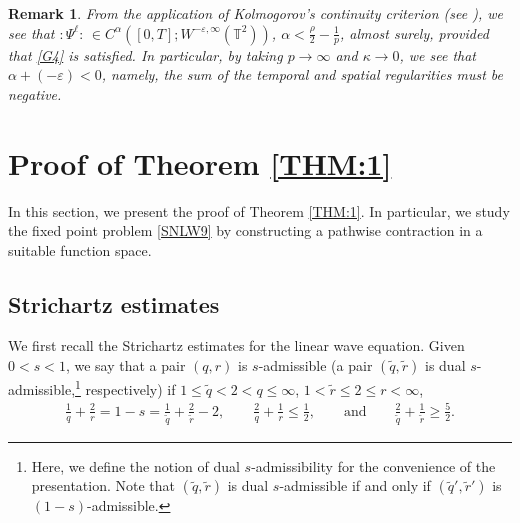 \documentclass[letterpaper, 11pt,  reqno]{amsart}
\newtheorem{remark}[theorem]{Remark}
\newcommand{\1}{\hspace{0.5mm}\text{I}\hspace{0.5mm}}
\newcommand{\T}{\mathbb{T}}
\newcommand{\al}{\alpha}
\newcommand{\dl}{\delta}
\newcommand{\eps}{\varepsilon}
\newcommand{\wt}{\widetilde}
\renewcommand{\l}{\ell}
\numberwithin{equation}{section}
\numberwithin{theorem}{section}
\newcommand{\notemax}[1]{\marginpar{\color{red} $\Leftarrow\Leftarrow\Leftarrow$}{\color{red}MAX: #1}}
\begin{document}
\begin{remark} \rm
From the application of Kolmogorov's continuity criterion (see \cite[Exercise 8.2]{Bass}), 
we see that 
$:\! \Psi^{\ell}\!\! : \, \in C^\al  ([0, T] ; W^{- \eps,\infty}(\T^2))$,
$\al < \frac{\rho}{2} - \frac 1p$,  almost surely,
provided that \eqref{G4} is satisfied.
In particular,  by taking $p \to \infty$ and $\kappa \to 0$, 
we see that $\al + (- \eps) < 0$,
namely, the sum of the temporal and spatial regularities must be negative.



\end{remark}

%
%




\section{Proof of Theorem \ref{THM:1}}
\label{SEC:3}


In this section, we present the proof of Theorem \ref{THM:1}.
In particular, we study the fixed point problem
\eqref{SNLW9}
by constructing a pathwise contraction
in a suitable function space.


\subsection{Strichartz estimates}
\label{SUBSEC:3.1}

We first recall the Strichartz estimates
for the  linear wave equation.
Given  $0 < s < 1$, 
we say that a pair $(q, r)$ is $s$-admissible 
(a pair $(\wt q, \wt r)$ is dual $s$-admissible,\footnote{Here, we define
the notion of dual $s$-admissibility for the convenience of the presentation.
Note that $(\wt q, \wt r)$ is dual $s$-admissible
if and only if $(\wt q', \wt r')$ is $(1-s)$-admissible.}
 respectively)
if $1 \leq \wt q < 2 < q \leq \infty$, 
 $1< \wt r \le 2 \leq r < \infty$, 
\begin{align}
 \frac{1}{q} + \frac 2r  = 1-  s =  \frac1{\wt q}+ \frac2{\wt r} -2, 
\qquad
\frac 2q + \frac{1}{r} \leq \frac 1 2, 
\qquad \text{and} 
\qquad  
\frac2{\wt q}+\frac1{\wt r} \geq \frac52   .
\label{admis1}
\end{align}
\end{document}
